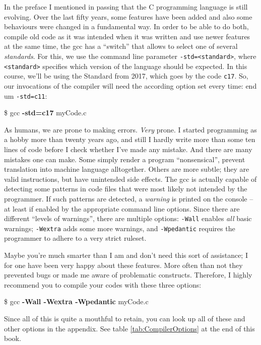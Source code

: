 In the preface I mentioned in passing that the C programming language is still evolving. Over the last fifty years, some features have been added and also some behaviours were changed in a fundamental way. In order to be able to do both, compile old code as it was intended when it was written and use newer features at the same time, the gcc has a \enquote{switch} that allows to select one of several \emph{standards}. For this, we use the command line parameter \texttt{-std=<standard>}, where \texttt{<standard>} specifies which version of the language should be expected. In this course, we'll be using the Standard from 2017, which goes by the code \texttt{c17}. So, our invocations of the compiler will need the according option set every time:
end um \texttt{-std=c11}:
\begin{cmdbox}
\$ gcc \textbf{-std=c17} myCode.c
\end{cmdbox}

As humans, we are prone to making errors. \emph{Very} prone. I started programming as a hobby more than twenty years ago, and still I hardly write more than some ten lines of code before I check whether I've made any mistake. And there are many mistakes one can make. Some simply render a program \enquote{nonsensical}, \ie prevent translation into machine language alltogether. Others are more subtle; they are valid instructions, but have unintended side effects. The gcc is actually capable of detecting some patterns in code files that were most likely not intended by the programmer. If such patterns are detected, a \emph{warning} is printed on the console -- at least if enabled by the appropriate command line options. Since there are different \enquote{levels of warnings}, there are multiple options: \texttt{-Wall} enables \emph{all} basic warnings; \texttt{-Wextra} adds some more warnings, and \texttt{-Wpedantic} requires the programmer to adhere to a very strict ruleset.

Maybe you're much smarter than I am and don't need this sort of assistance; I for one have been very happy about these features. More often than not they prevented bugs or made me aware of problematic constructs. Therefore, I highly recommend you to compile your codes with these three options:
\begin{cmdbox}
\$ gcc \textbf{-Wall -Wextra -Wpedantic} myCode.c
\end{cmdbox}

Since all of this is quite a mouthful to retain, you can look up all of these and other options in the appendix. See table \ref{tab:CompilerOptions} at the end of this book.

